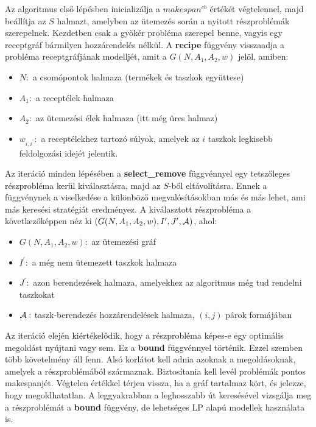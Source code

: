 Az algoritmus első lépésben inicializálja a $makespan^{cb}$ értékét végtelennel, majd beállítja az $S$ halmazt, amelyben az ütemezés során a nyitott részproblémák szerepelnek. Kezdetben csak a gyökér probléma szerepel benne, vagyis egy receptgráf bármilyen hozzárendelés nélkül. A \textbf{recipe} függvény visszaadja a probléma receptgráfjának modelljét, amit a $G(N,A_1,A_2,w)$ jelöl, amiben:
\begin{itemize}
	\item $N:$ a csomópontok halmaza (termékek és taszkok együttese)
	\item $A_{1}:$ a receptélek halmaza
	\item $A_{2}:$ az ütemezési élek halmaza (itt még üres halmaz)
	\item $w_{i,i^{'}}:$ a receptélekhez tartozó súlyok, amelyek az $i$ taszkok legkisebb feldolgozási idejét jelentik.
\end{itemize}

Az iteráció minden lépésében a \textbf{select\_remove} függvénnyel egy tetszőleges részprobléma kerül kiválasztásra, majd az $S$-ből eltávolításra. Ennek a függvénynek a viselkedése a különböző megvalósításokban más és más lehet, ami más keresési stratégiát eredményez. A kiválasztott részprobléma a következőképpen néz ki $(G(N,A_1,A_2,w),I',J',{\cal A})$, ahol:
\begin{itemize}
	\item $G(N,A_{1},A_{2},w):$ az ütemezési gráf
	\item $I^{'}:$ a még nem ütemezett taszkok halmaza
	\item $J^{'}:$ azon berendezések halmaza, amelyekhez az algoritmus még tud rendelni taszkokat 
	\item $\cal{A}:$ taszk-berendezés hozzárendelések halmaza, $(i,j)$ párok formájában 
\end{itemize}

Az iteráció elején kiértékelődik, hogy a részprobléma képes-e egy optimális megoldást nyújtani vagy sem. Ez a \textbf{bound} függvénnyel történik. Ezzel szemben több követelmény áll fenn. Alsó korlátot kell adnia azoknak a megoldásoknak, amelyek a részproblémából származnak. Biztosítania kell levél problémák pontos makespanjét. Végtelen értékkel térjen vissza, ha a gráf tartalmaz kört, és jelezze, hogy megoldhatatlan. A leggyakrabban a leghosszabb út keresésével vizsgálja meg a részproblémát a \textbf{bound} függvény, de lehetséges LP alapú modellek használata is.

